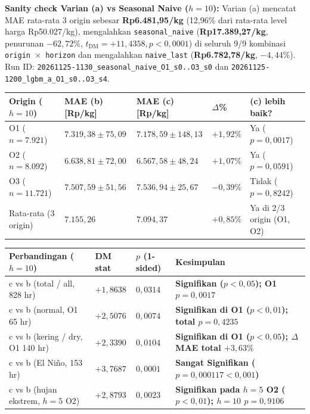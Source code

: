 \documentclass[11pt,a4paper]{article}
\begin{document}
\noindent\textbf{Sanity check Varian (a) vs Seasonal Naive ($h=10$):}
Varian (a) mencatat MAE rata-rata 3 origin sebesar \textbf{Rp6.481,95/kg} (12,96\% dari rata-rata level harga Rp50.027/kg), mengalahkan \texttt{seasonal\_naive} (\textbf{Rp17.389,27/kg}, penurunan \textbf{$-62{,}72\%$}, $t_{\text{DM}} = +11{,}4358, p < 0{,}0001$) di seluruh 9/9 kombinasi \texttt{origin $\times$ horizon} dan mengalahkan \texttt{naive\_last} (\textbf{Rp6.782,78/kg}, $-4{,}44\%$). Run ID: \texttt{20261125-1130\_seasonal\_naive\_O1\_s0..O3\_s0} dan \texttt{20261125-1200\_lgbm\_a\_O1\_s0..O3\_s4}.

\begin{table}[H]
\centering
\small
\begin{tabular}{@{}L{2.8cm}C{2.4cm}C{2.4cm}C{2.0cm}C{3.2cm}@{}}
\toprule
Origin ($h=10$) & MAE (b) [Rp/kg] & MAE (c) [Rp/kg] & $\Delta$\% & (c) lebih baik? \\
\midrule
O1 ($n=7.921$) & $7.319{,}38 \pm 75{,}09$ & $7.178{,}59 \pm 148{,}13$ & $+1{,}92\%$ & Ya ($p=0{,}0017$) \\
O2 ($n=8.092$) & $6.638{,}81 \pm 72{,}00$ & $6.567{,}58 \pm 48{,}24$ & $+1{,}07\%$ & Ya ($p=0{,}0591$) \\
O3 ($n=11.721$) & $7.507{,}59 \pm 51{,}56$ & $7.536{,}94 \pm 25{,}67$ & $-0{,}39\%$ & Tidak ($p=0{,}8242$) \\
\midrule
Rata-rata (3 origin) & $7.155{,}26$ & $7.094{,}37$ & $+0{,}85\%$ & Ya di 2/3 origin (O1, O2) \\
\bottomrule
\end{tabular}
\end{table}

\begin{table}[H]
\centering
\small
\begin{tabular}{@{}L{4.2cm}C{2.0cm}C{2.2cm}L{5.0cm}@{}}
\toprule
Perbandingan ($h=10$) & DM stat & $p$ (1-sided) & Kesimpulan \\
\midrule
c vs b (total / all, 828 hr) & $+1{,}8638$ & $0{,}0314$ & \textbf{Signifikan ($p < 0{,}05$); O1 $p=0{,}0017$} \\
c vs b (normal, O1 65 hr) & $+2{,}5076$ & $0{,}0074$ & \textbf{Signifikan di O1 ($p < 0{,}01$); total $p=0{,}4235$} \\
c vs b (kering / dry, O1 140 hr) & $+2{,}3390$ & $0{,}0104$ & \textbf{Signifikan di O1 ($p < 0{,}05$); $\Delta$MAE total $+3{,}63\%$} \\
c vs b (El Ni\~no, 153 hr) & $+3{,}7687$ & $0{,}0001$ & \textbf{Sangat Signifikan ($p = 0{,}000117 < 0{,}001$)} \\
c vs b (hujan ekstrem, $h=5$ O2) & $+2{,}8793$ & $0{,}0023$ & \textbf{Signifikan pada $h=5$ O2 ($p < 0{,}01$); $h=10$ $p=0{,}9106$} \\
\bottomrule
\end{tabular}
\end{table}
\end{document}
